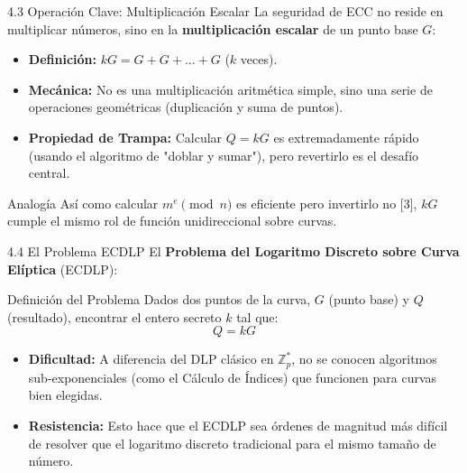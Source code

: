 \documentclass{beamer}
\begin{document}
\begin{frame}{4.3 Operación Clave: Multiplicación Escalar}
    La seguridad de ECC no reside en multiplicar números, sino en la \textbf{multiplicación escalar} de un punto base $G$:
    \begin{itemize}
        \item \textbf{Definición:} $kG = G + G + \dots + G$ ($k$ veces).
        \item \textbf{Mecánica:} No es una multiplicación aritmética simple, sino una serie de operaciones geométricas (duplicación y suma de puntos).
        \item \textbf{Propiedad de Trampa:} Calcular $Q = kG$ es extremadamente rápido (usando el algoritmo de "doblar y sumar"), pero revertirlo es el desafío central.
    \end{itemize}
    \begin{exampleblock}{Analogía}
        Así como calcular $m^e \pmod n$ es eficiente pero invertirlo no [3], $kG$ cumple el mismo rol de función unidireccional sobre curvas.
    \end{exampleblock}
\end{frame}

\begin{frame}{4.4 El Problema ECDLP}
    El \textbf{Problema del Logaritmo Discreto sobre Curva Elíptica} (ECDLP):
    \begin{block}{Definición del Problema}
        Dados dos puntos de la curva, $G$ (punto base) y $Q$ (resultado), encontrar el entero secreto $k$ tal que:
        $$Q = kG$$
    \end{block}
    \begin{itemize}
        \item \textbf{Dificultad:} A diferencia del DLP clásico en $\mathbb{Z}_p^*$, no se conocen algoritmos sub-exponenciales (como el Cálculo de Índices) que funcionen para curvas bien elegidas.
        \item \textbf{Resistencia:} Esto hace que el ECDLP sea órdenes de magnitud más difícil de resolver que el logaritmo discreto tradicional para el mismo tamaño de número.
    \end{itemize}
\end{frame}
\end{document}
